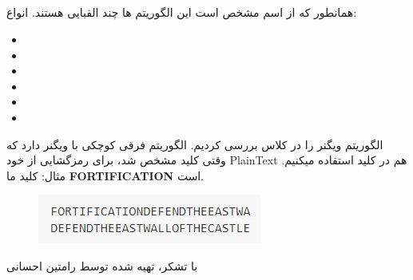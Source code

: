 \subsection{}
همانطور که از اسم مشخص است این الگوریتم ها چند الفبایی هستند.
انواع:
\begin{itemize}
    \item   
    \item
    \item
    \item
    \item
    \item
\end{itemize}
الگوریتم ویگنر را در کلاس بررسی کردیم. الگوریتم 
فرقی کوچکی با ویگنر دارد که وقتی کلید مشخص شد،
برای رمزگشایی از خود PlainText هم در کلید استفاده میکنیم.
مثال:
کلید ما 
\textbf{FORTIFICATION}
است.
\begin{figure}[H]
    \centering
    \includegraphics[width=0.5\linewidth]{images/auto.JPG}
    \caption{}
    \label{fig:Polygram}
\end{figure}

با تشکر، تهیه شده توسط رامتین احسانی
\nocite{*}
